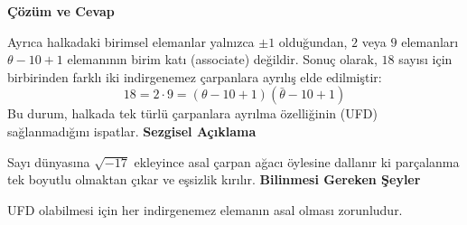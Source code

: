 \documentclass[11pt, a4paper]{article}
\newenvironment{cozum}{
    \vspace{0.5cm}
    \noindent\textcolor{green!60!black}{\faCheckCircle\enspace \textbf{\Large Çözüm ve Cevap}}\par\vspace{0.2cm}
}{}
\newenvironment{sezgisel}{
    \vspace{0.5cm}
    \noindent\textcolor{orange!80!black}{\faLightbulb\enspace \textbf{\Large Sezgisel Açıklama}}\par\vspace{0.2cm}
    \itshape
}{}
\newenvironment{bilgi}{
    \vspace{0.5cm}
    \noindent\textcolor{red!70!black}{\faExclamationTriangle\enspace \textbf{\Large Bilinmesi Gereken Şeyler}}\par\vspace{0.2cm}
}{}
\begin{document}
\begin{cozum}
Ayrıca halkadaki birimsel elemanlar yalnızca $\pm 1$ olduğundan, $2$ veya $9$ elemanları $\theta - 10 + 1$ elemanının birim katı (associate) değildir. Sonuç olarak, $18$ sayısı için birbirinden farklı iki indirgenemez çarpanlara ayrılış elde edilmiştir:
\[ 18 = 2 \cdot 9 = (\theta - 10 + 1)(\bar{\theta} - 10 + 1) \]
Bu durum, halkada tek türlü çarpanlara ayrılma özelliğinin (UFD) sağlanmadığını ispatlar.
\end{cozum}
\begin{sezgisel}
Sayı dünyasına $\sqrt{-17}$ ekleyince asal çarpan ağacı öylesine dallanır ki parçalanma tek boyutlu olmaktan çıkar ve eşsizlik kırılır.
\end{sezgisel}
\begin{bilgi}
UFD olabilmesi için her indirgenemez elemanın asal olması zorunludur.
\end{bilgi}

\newpage
\end{document}

